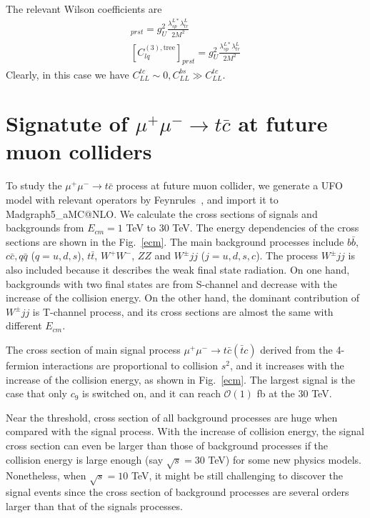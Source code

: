 \documentclass[a4paper,11pt]{article}
\makeatletter
\newcommand{\mgamc}{Madgraph5\_aMC@NLO}
\makeatother
\begin{document}
\begin{enumerate}
\begin{align}
        \end{align}
        The relevant Wilson coefficients are
        \begin{align}
            [C_{lq}^{(1),\textrm{tree}}]_{prst}=g_U^2\frac{\lambda_{sp}^{L*}\lambda_{tr}^{L}}{2M^2}\\
            [C_{lq}^{(3),\textrm{tree}}]_{prst}=g_U^2\frac{\lambda_{sp}^{L*}\lambda_{tr}^{L}}{2M^2}
        \end{align}
        Clearly, in this case we have $C_{LL}^{tc}\sim0,C_{LL}^{bs}\gg C_{LL}^{tc}$.
\end{enumerate}

\section{Signatute of $\mu^+\mu^-\to t\bar{c}$ at future muon colliders }
\label{Sec:result}

To study the $\mu^+\mu^-\to t\bar{c}$ process at future muon collider, 
we generate a UFO model with relevant operators by Feynrules~\cite{Alloul:2013bka}, 
and import it to \mgamc \cite{Alwall:2014hca}. 
We calculate the cross sections of signals and backgrounds from $E_{cm}=1$ TeV to $30$ TeV.  
The energy dependencies of the cross sections are shown in the Fig.~\ref{ecm}. 
The main background processes include $b\bar{b}$, $c\bar{c}, $$q\bar{q}$ ($q=u,d,s$), 
$t\bar{t}$, $W^+W^-$, $ZZ$ and $W^{\pm}jj$ ($j=u,d,s,c$). 
The process $W^{\pm}jj$ is also included because it describes the weak final state radiation. 
On one hand, backgrounds with two final states are from S-channel and decrease with the increase of the collision energy.
On the other hand, the dominant contribution of $W^{\pm}jj$ is T-channel process, 
and its cross sections are almost the same with different $E_{cm}$.

The cross section of main signal process $\mu^+ \mu^- \to t \bar{c} (\bar{t} c)$ derived from the 4-fermion interactions are proportional to collision $s^2$, and it increases with the increase of the collision energy, as shown in Fig.~\ref{ecm}. 
The largest signal is the case that only $c_{9}$ is switched on, and it can reach $\mathcal{O}(1)$ fb at the $30$ TeV. 

Near the threshold, cross section of all background processes are huge when compared with the signal process. 
With the increase of collision energy, the signal cross section can even be larger than those of background processes if the collision energy is large enough (say $\sqrt{s}=30$ TeV) for some new physics models. 
Nonetheless, when $\sqrt{s}=10$ TeV, it might be still challenging to discover the signal events since the cross section of background processes are several orders larger than that of the signals processes.
\end{document}
